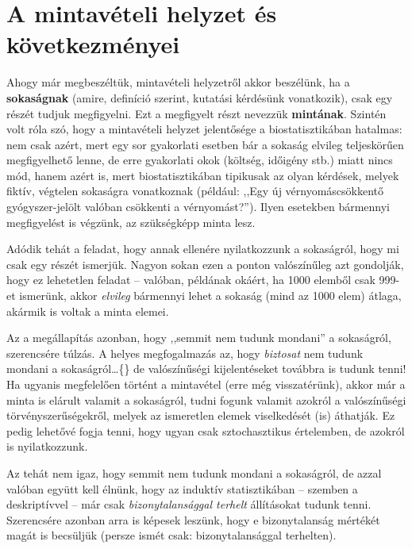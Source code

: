 \documentclass[]{book}
\begin{document}
\hypertarget{induktivmintavetelihelyzet}{%
\section{A mintavételi helyzet és következményei}\label{induktivmintavetelihelyzet}}

Ahogy már megbeszéltük, mintavételi helyzetről akkor beszélünk, ha a \textbf{sokaságnak} (amire, definíció szerint, kutatási kérdésünk vonatkozik), csak egy részét tudjuk megfigyelni. Ezt a megfigyelt részt nevezzük \textbf{mintának}. Szintén volt róla szó, hogy a mintavételi helyzet jelentősége a biostatisztikában hatalmas: nem csak azért, mert egy sor gyakorlati esetben bár a sokaság elvileg teljeskörűen megfigyelhető lenne, de erre gyakorlati okok (költség, időigény stb.) miatt nincs mód, hanem azért is, mert biostatisztikában tipikusak az olyan kérdések, melyek fiktív, végtelen sokaságra vonatkoznak (például: ,,Egy új vérnyomáscsökkentő gyógyszer-jelölt valóban csökkenti a vérnyomást?''). Ilyen esetekben bármennyi megfigyelést is végzünk, az szükségképp minta lesz.

Adódik tehát a feladat, hogy annak ellenére nyilatkozzunk a sokaságról, hogy mi csak egy részét ismerjük. Nagyon sokan ezen a ponton valószínűleg azt gondolják, hogy ez lehetetlen feladat -- valóban, példának okáért, ha 1000 elemből csak 999-et ismerünk, akkor \emph{elvileg} bármennyi lehet a sokaság (mind az 1000 elem) átlaga, akármik is voltak a minta elemei.

Az a megállapítás azonban, hogy ,,semmit nem tudunk mondani'' a sokaságról, szerencsére túlzás. A helyes megfogalmazás az, hogy \emph{biztosat} nem tudunk mondani a sokaságról\dots\{\} de valószínűségi kijelentéseket továbbra is tudunk tenni! Ha ugyanis megfelelően történt a mintavétel (erre még visszatérünk), akkor már a minta is elárult valamit a sokaságról, tudni fogunk valamit azokról a valószínűségi törvényszerűségekről, melyek az ismeretlen elemek viselkedését (is) áthatják. Ez pedig lehetővé fogja tenni, hogy ugyan csak sztochasztikus értelemben, de azokról is nyilatkozzunk.

Az tehát nem igaz, hogy semmit nem tudunk mondani a sokaságról, de azzal valóban együtt kell élnünk, hogy az induktív statisztikában -- szemben a deskriptívvel -- már csak \emph{bizonytalansággal terhelt} állításokat tudunk tenni. Szerencsére azonban arra is képesek leszünk, hogy e bizonytalanság mértékét magát is becsüljük (persze ismét csak: bizonytalansággal terhelten).
\end{document}
